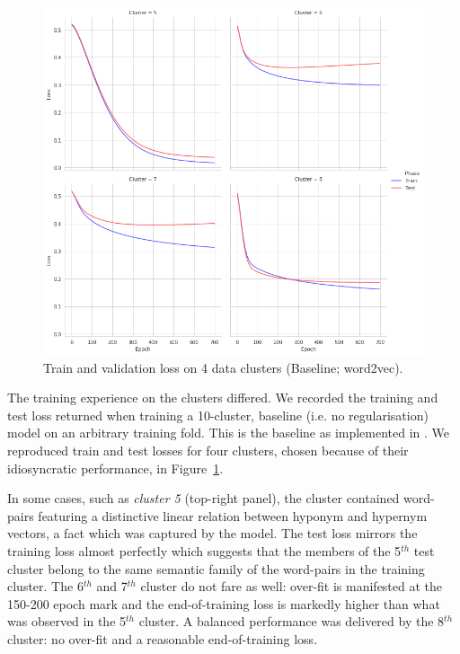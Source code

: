 \begin{figure}[ht!] 
  \centering
  \includegraphics[width=1.\linewidth]{images/Train_losses_4_clusters_baseline_w2v.png}
  \caption{Train and validation loss on 4 data clusters (Baseline; word2vec).}
  \label{fig:train_test_loss_w2v}
\end{figure}

The training experience on the clusters differed.  We recorded the training and test loss returned when training a 10-cluster, baseline (i.e. no regularisation) model on an arbitrary training fold. This is the \citep{Fu2014} baseline as implemented in \citep{ustalov2017negative}.  We reproduced train and test losses for four clusters, chosen because of their idiosyncratic performance, in Figure~\ref{fig:train_test_loss_w2v}.

In some cases, such as \textit{cluster 5} (top-right panel), the cluster contained word-pairs featuring a distinctive linear relation between hyponym and hypernym vectors, a fact which was captured by the model.  The test loss mirrors the training loss almost perfectly which suggests that the members of the 5$^{th}$ test cluster belong to the same semantic family of the word-pairs in the training cluster.  The 6$^{th}$ and 7$^{th}$ cluster do not fare as well: over-fit is manifested at the 150-200 epoch mark and the end-of-training loss is markedly higher than what was observed in the 5$^{th}$ cluster.  A balanced performance was delivered by the 8$^{th}$ cluster: no over-fit and a reasonable end-of-training loss.

